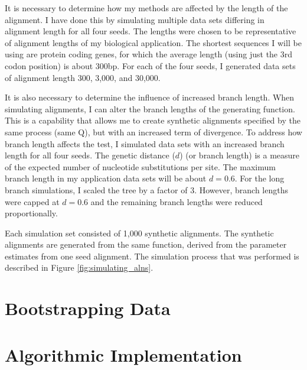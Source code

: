 It is necessary to determine how my methods are affected by the length of the alignment. I have done this by simulating multiple data sets differing in alignment length for all four seeds. The lengths were chosen to be representative of alignment lengths of my biological application. The shortest sequences I will be using are protein coding genes, for which the average length (using just the 3rd codon position) is about 300bp. For each of the four seeds, I generated data sets of alignment length 300, 3,000, and 30,000.   

It is also necessary to determine the influence of increased branch length. When simulating alignments, I can alter the branch lengths of the generating function. This is a capability that allows me to create synthetic alignments specified by the same process (same $\mathrm{Q}$), but with an increased term of divergence. To address how branch length affects the test, I simulated data sets with an increased branch length for all four seeds. The genetic distance ($d$) (or branch length) is a measure of the expected number of nucleotide substitutions per site. The maximum branch length in my application data sets will be about $d=0.6$. For the long branch simulations, I scaled the tree by a factor of 3. However, branch lengths were capped at $d=0.6$ and the remaining branch lengths were reduced proportionally. 

Each simulation set consisted of 1,000 synthetic alignments. The synthetic alignments are generated from the same function, derived from the parameter estimates from one seed alignment. The simulation process that was performed is described in Figure \ref{fig:simulating_alns}.



\section{Bootstrapping Data}

\section{Algorithmic Implementation}

